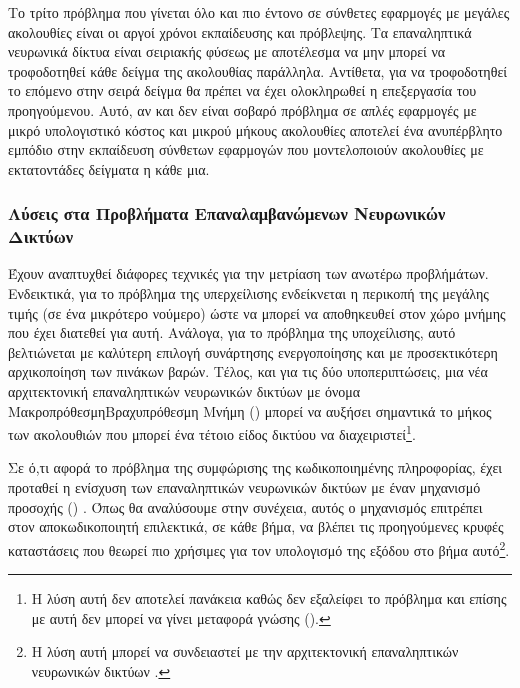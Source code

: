 Το τρίτο πρόβλημα που γίνεται όλο και πιο έντονο σε σύνθετες εφαρμογές με μεγάλες ακολουθίες είναι οι αργοί χρόνοι εκπαίδευσης και πρόβλεψης. Τα επαναληπτικά νευρωνικά δίκτυα είναι σειριακής φύσεως με αποτέλεσμα να μην μπορεί να τροφοδοτηθεί κάθε δείγμα της ακολουθίας παράλληλα. Αντίθετα, για να τροφοδοτηθεί το επόμενο στην σειρά δείγμα θα πρέπει να έχει ολοκληρωθεί η επεξεργασία του προηγούμενου. Αυτό, αν και δεν είναι σοβαρό πρόβλημα σε απλές εφαρμογές με μικρό υπολογιστικό κόστος και μικρού μήκους ακολουθίες αποτελεί ένα ανυπέρβλητο εμπόδιο στην εκπαίδευση σύνθετων εφαρμογών που μοντελοποιούν ακολουθίες με εκτατοντάδες δείγματα η κάθε μια.

\subsubsection{Λύσεις στα Προβλήματα Επαναλαμβανώμενων Νευρωνικών Δικτύων}

Έχουν αναπτυχθεί διάφορες τεχνικές για την μετρίαση των ανωτέρω προβλήμάτων. Ενδεικτικά, για το πρόβλημα της υπερχείλισης ενδείκνεται η περικοπή της μεγάλης τιμής (σε ένα μικρότερο νούμερο) ώστε να μπορεί να αποθηκευθεί στον χώρο μνήμης που έχει διατεθεί για αυτή\cite{youtubeRNN}. Ανάλογα, για το πρόβλημα της υποχείλισης, αυτό βελτιώνεται με καλύτερη επιλογή συνάρτησης ενεργοποίησης και με προσεκτικότερη αρχικοποίηση των πινάκων βαρών\cite{youtubeRNN}. Τέλος, και για τις δύο υποπεριπτώσεις, μια νέα αρχιτεκτονική επαναληπτικών νευρωνικών δικτύων με όνομα Μακροπρόθεσμη\textendash Βραχυπρόθεσμη Μνήμη ()\cite{hochreiter1997lstm} μπορεί να αυξήσει σημαντικά το μήκος των ακολουθιών που μπορεί ένα τέτοιο είδος δικτύου να διαχειριστεί\footnote{Η λύση αυτή δεν αποτελεί πανάκεια καθώς δεν εξαλείφει το πρόβλημα και επίσης με αυτή δεν μπορεί να γίνει μεταφορά γνώσης ()\cite{youtubeRNNleo}.}.\par

Σε ό,τι αφορά το πρόβλημα της συμφώρισης της κωδικοποιημένης πληροφορίας, έχει προταθεί η ενίσχυση των επαναληπτικών νευρωνικών δικτύων με έναν μηχανισμό προσοχής () \cite{rumelhart1985learning_internal_representations}. Όπως θα αναλύσουμε στην συνέχεια, αυτός ο μηχανισμός επιτρέπει στον αποκωδικοποιητή επιλεκτικά, σε κάθε βήμα, να βλέπει τις προηγούμενες κρυφές καταστάσεις που θεωρεί πιο χρήσιμες για τον υπολογισμό της εξόδου στο βήμα αυτό\footnote{Η λύση αυτή μπορεί να συνδειαστεί με την αρχιτεκτονική επαναληπτικών νευρωνικών δικτύων .}. \par

